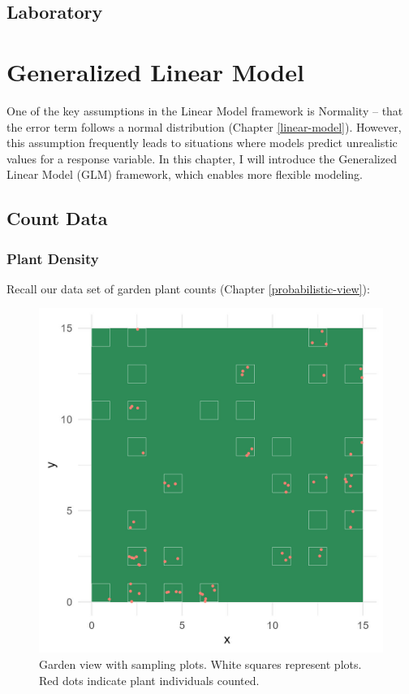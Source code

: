 \documentclass[
]{book}
\begin{document}
\hypertarget{laboratory-6}{%
\section{Laboratory}\label{laboratory-6}}

\hypertarget{generalized-linear-model}{%
\chapter{Generalized Linear Model}\label{generalized-linear-model}}

One of the key assumptions in the Linear Model framework is Normality -- that the error term follows a normal distribution (Chapter \ref{linear-model}). However, this assumption frequently leads to situations where models predict unrealistic values for a response variable. In this chapter, I will introduce the Generalized Linear Model (GLM) framework, which enables more flexible modeling.

\hypertarget{count-data}{%
\section{Count Data}\label{count-data}}

\hypertarget{plant-density}{%
\subsection{Plant Density}\label{plant-density}}

Recall our data set of garden plant counts (Chapter \ref{probabilistic-view}):

\begin{figure}

{\centering \includegraphics[width=16.67in]{image/figure_garden} 

}

\caption{Garden view with sampling plots. White squares represent plots. Red dots indicate plant individuals counted.}\label{fig:garden-recall}
\end{figure}
\end{document}
